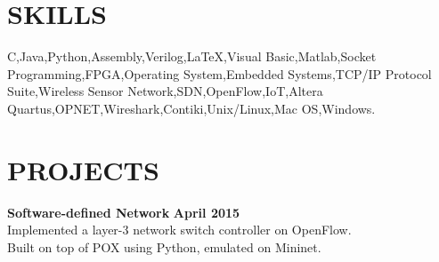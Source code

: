 \documentclass[margin,line]{resume}
\begin{document}
\begin{resume}
\sectionline

    \section{\mysidestyle \textbf{\large{S}\small{KILLS}}}

    C,\hspace{2mm}Java,\hspace{2mm}Python,\hspace{2mm}Assembly,\hspace{2mm}Verilog,\hspace{2mm}\LaTeX,\hspace{2mm}Visual Basic,\hspace{2mm}Matlab,\hspace{2mm}Socket Programming,\hspace{2mm}FPGA,\hspace{2mm}Operating System,\hspace{2mm}Embedded Systems,\hspace{2mm}TCP/IP Protocol Suite,\hspace{2mm}Wireless Sensor Network,\hspace{2mm}SDN,\hspace{2mm}OpenFlow,\hspace{2mm}IoT,\hspace{2mm}Altera Quartus,\hspace{2mm}OPNET,\hspace{2mm}Wireshark,\hspace{2mm}Contiki,\hspace{2mm}Unix/Linux,\hspace{2mm}Mac OS,\hspace{2mm}Windows.

\sectionline

    \section{\mysidestyle \textbf{\large{P}\small{ROJECTS}}}

    \textbf{\listing Software-defined Network} \hfill \textbf{April 2015}\vspace{2mm}\\
    Implemented a layer-3 network switch controller on OpenFlow.\\
    Built on top of POX using Python, emulated on Mininet.     


\end{resume}
\end{document}
